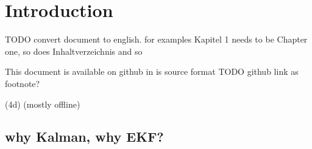 

\chapter{Introduction}

TODO convert document to english. for examples Kapitel 1 needs to be Chapter one, so does Inhaltverzeichnis and so 

This document is available on github in is source format \cite{Schons_Development_and_validation_2021}
TODO github link as footnote?

(4d) (mostly offline)




\section{why Kalman, why EKF?}

